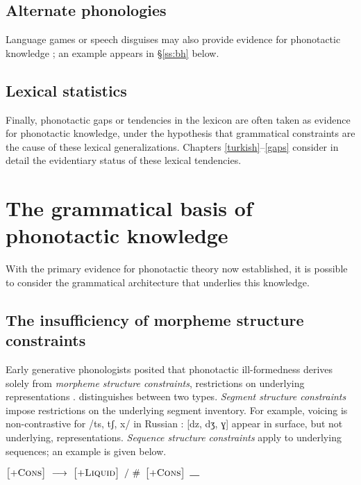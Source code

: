\subsection{Alternate phonologies}

Language games or speech disguises may also provide evidence for phonotactic knowledge \citep[e.g.,][]{Vaux2011}; an example appears in \S\ref{ss:bh} below.

\subsection{Lexical statistics}

Finally, phonotactic gaps or tendencies in the lexicon are often taken as evidence for phonotactic knowledge, under the hypothesis that grammatical constraints are the cause of these lexical generalizations.
Chapters \ref{turkish}--\ref{gaps} consider in detail the evidentiary status of these lexical tendencies.

\section{The grammatical basis of phonotactic knowledge}

With the primary evidence for phonotactic theory now established, it is possible to consider the grammatical architecture that underlies this knowledge.

\subsection{The insufficiency of morpheme structure constraints}

Early generative phonologists posited that phonotactic ill-formedness derives solely from \emph{morpheme structure constraints}, restrictions on underlying representations \citep{Chomsky1965,SPE,SPR,Halle1962}.
\citet{Stanley1967} distinguishes between two types.
\emph{Segment structure constraints} impose restrictions on the underlying segment inventory.
For example, voicing is non-contrastive for /ts, tʃ, x/ in Russian \cite[22]{SPR}: [dz, dʒ, ɣ] appear in surface, but not underlying, representations.
\emph{Sequence structure constraints} apply to underlying sequences; an example is given below.

\begin{example}
$\begin{bmatrix} +\textsc{Cons} \end{bmatrix}~\goesto~\begin{bmatrix} +\textsc{Liquid} \end{bmatrix}~/~\#~\begin{bmatrix} +\textsc{Cons} \end{bmatrix}~\gap$
\end{example}

